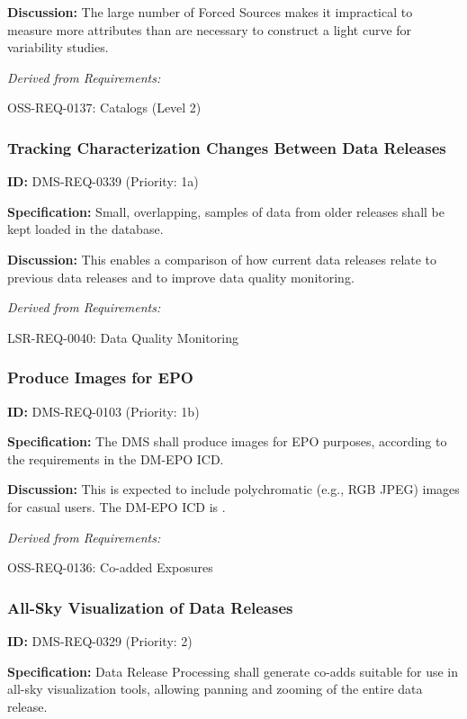 \documentclass[SE,toc,lsstdraft]{lsstdoc}
\begin{document}
\textbf{Discussion: }The large number of Forced Sources makes it impractical to measure more attributes than are necessary to construct a light curve for variability studies.

\emph{Derived from Requirements:}

OSS-REQ-0137:
Catalogs (Level 2) \newline

\subsubsection{Tracking Characterization Changes Between Data Releases}

\label{DMS-REQ-0339}
\textbf{ID:} DMS-REQ-0339 (Priority: 1a)

\textbf{Specification:} Small, overlapping, samples of data from older releases shall be kept loaded in the database.

\textbf{Discussion: }This enables a comparison of how current data releases relate to previous data releases and to improve data quality monitoring.

\emph{Derived from Requirements:}

LSR-REQ-0040:
Data Quality Monitoring \newline

\subsubsection{Produce Images for EPO}

\label{DMS-REQ-0103}
\textbf{ID:} DMS-REQ-0103 (Priority: 1b)

\textbf{Specification:} The DMS shall produce images for EPO purposes, according to the requirements in the DM-EPO ICD.

    \textbf{Discussion: }This is expected to include polychromatic (e.g., RGB JPEG) images for casual users. The DM-EPO ICD is .

\emph{Derived from Requirements:}

OSS-REQ-0136:
Co-added Exposures \newline

\subsubsection{All-Sky Visualization of Data Releases}

\label{DMS-REQ-0329}
\textbf{ID:} DMS-REQ-0329 (Priority: 2)

\textbf{Specification:} Data Release Processing shall generate co-adds suitable for use in all-sky visualization tools, allowing panning and zooming of the entire data release.
\end{document}
